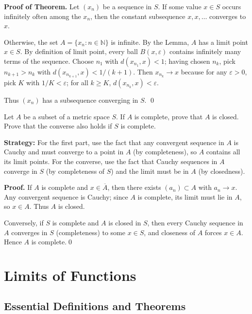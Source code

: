 \textbf{Proof of Theorem.}
Let \((x_n)\) be a sequence in \(S\).
If some value \(x\in S\) occurs infinitely often among the \(x_n\), then the constant subsequence \(x,x,\dots\) converges to \(x\).

Otherwise, the set \(A=\{x_n:n\in\mathbb{N}\}\) is infinite. By the Lemma, \(A\) has a limit point \(x\in S\). By definition of limit point, every ball \(B(x,\varepsilon)\) contains infinitely many terms of the sequence. Choose \(n_1\) with \(d(x_{n_1},x)<1\); having chosen \(n_k\), pick \(n_{k+1}>n_k\) with \(d(x_{n_{k+1}},x)<1/(k+1)\). Then \(x_{n_k}\to x\) because for any \(\varepsilon>0\), pick \(K\) with \(1/K<\varepsilon\); for all \(k\ge K\), \(d(x_{n_k},x)<\varepsilon\).

Thus \((x_n)\) has a subsequence converging in \(S\). \qed
\medskip



\begin{problembox}
Let $A$ be a subset of a metric space $S$. If $A$ is complete, prove that $A$ is closed. Prove that the converse also holds if $S$ is complete.
\end{problembox}

\noindent\textbf{Strategy:} For the first part, use the fact that any convergent sequence in $A$ is Cauchy and must converge to a point in $A$ (by completeness), so $A$ contains all its limit points. For the converse, use the fact that Cauchy sequences in $A$ converge in $S$ (by completeness of $S$) and the limit must be in $A$ (by closedness).

\noindent\textbf{Proof.}
If $A$ is complete and $x\in\overline{A}$, then there exists $(a_n)\subset A$ with $a_n\to x$. Any convergent sequence is Cauchy; since $A$ is complete, its limit must lie in $A$, so $x\in A$. Thus $A$ is closed.

Conversely, if $S$ is complete and $A$ is closed in $S$, then every Cauchy sequence in $A$ converges in $S$ (completeness) to some $x\in S$, and closeness of $A$ forces $x\in A$. Hence $A$ is complete.\qed
\medskip

\section{Limits of Functions}

\subsection*{Essential Definitions and Theorems}


